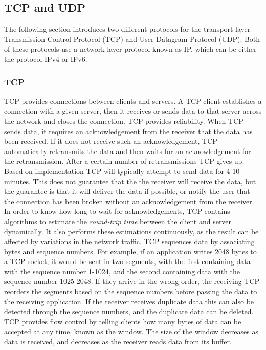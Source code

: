 \subsection{TCP and UDP}
The following section introduces two different protocols for the transport layer - Transmission Control Protocol (TCP) and User Datagram Protocol (UDP).
Both of these protocols use a network-layer protocol known as IP, which can be either the protocol IPv4 or IPv6.

\subsubsection{TCP}
TCP provides connections between clients and servers.
A TCP client establishes a connection with a given server, then it receives or sends data to that server across the network and closes the connection.
TCP provides reliability.
When TCP sends data, it requires an acknowledgement from the receiver that the data has been received.
If it does not receive such an acknowledgement, TCP automatically retransmits the data and then waits for an acknowledgement for the retransmission.
After a certain number of retransmissions TCP gives up.
Based on implementation TCP will typically attempt to send data for 4-10 minutes.
This does not guarantee that the the receiver will receive the data, but the guarantee is that it will deliver the data if possible, or notify the user that the connection has been broken without an acknowledgement from the receiver.
In order to know how long to wait for acknowledgements, TCP contains algorithms to estimate the \textit{round-trip time} between the client and server dynamically.
It also performs these estimations continuously, as the result can be affected by variations in the network traffic.
TCP sequences data by associating bytes and sequence numbers.
For example, if an application writes 2048 bytes to a TCP socket, it would be sent in two segments, with the first containing data with the sequence number 1-1024, and the second containing data with the sequence number 1025-2048.
If they arrive in the wrong order, the receiving TCP reorders the segments based on the sequence numbers before passing the data to the receiving application.
If the receiver receives duplicate data this can also be detected through the sequence numbers, and the duplicate data can be deleted.
TCP provides flow control by telling clients how many bytes of data can be accepted at any time, known as the window.
The size of the window decreases as data is received, and decreases as the receiver reads data from its buffer.

